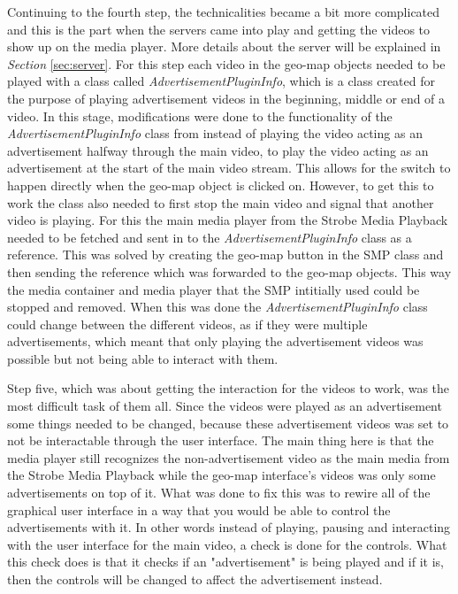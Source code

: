 Continuing to the fourth step, the technicalities became a bit more complicated and this is the part when the servers came into play and getting the videos to show up on the media player. More details about the server will be explained in \textit{Section} \ref{sec:server}. For this step each video in the geo-map objects needed to be played with a class called \textit{AdvertisementPluginInfo}, which is a class created for the purpose of playing advertisement videos in the beginning, middle or end of a video. In this stage, modifications were done to the functionality of the \textit{AdvertisementPluginInfo} class from instead of playing the video acting as an advertisement halfway through the main video, to play the video acting as an advertisement at the start of the main video stream. This allows for the switch to happen directly when the geo-map object is clicked on. However, to get this to work the class also needed to first stop the main video and signal that another video is playing. For this the main media player from the Strobe Media Playback needed to be fetched and sent in to the \textit{AdvertisementPluginInfo} class as a reference. This was solved by creating the geo-map button in the SMP class and then sending the reference which was forwarded to the geo-map objects. This way the media container and media player that the SMP intitially used could be stopped and removed. When this was done the \textit{AdvertisementPluginInfo} class could change between the different videos, as if they were multiple advertisements, which meant that only playing the advertisement videos was possible but not being able to interact with them. 

Step five, which was about getting the interaction for the videos to work, was the most difficult task of them all. Since the videos were played as an advertisement some things needed to be changed, because these advertisement videos was set to not be interactable through the user interface. The main thing here is that the media player still recognizes the non-advertisement video as the main media from the Strobe Media Playback while the geo-map interface's videos was only some advertisements on top of it. What was done to fix this was to rewire all of the graphical user interface in a way that you would be able to control the advertisements with it. In other words instead of playing, pausing and interacting with the user interface for the main video, a check is done for the controls. What this check does is that it checks if an "advertisement" is being played and if it is, then the controls will be changed to affect the advertisement instead.

